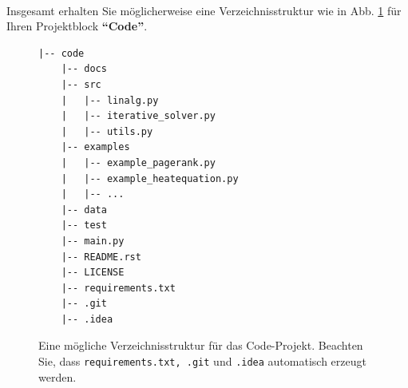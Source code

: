 ~\\
Insgesamt erhalten Sie möglicherweise eine Verzeichnisstruktur wie in Abb. \ref{fig:vz-struktur-code} für Ihren Projektblock \textbf{``Code''}.\\
\begin{figure}[h!]
	\centering
\begin{minipage}{0.4\textwidth}
\begin{verbatim}
|-- code
    |-- docs
    |-- src
    |   |-- linalg.py
    |   |-- iterative_solver.py
    |   |-- utils.py
    |-- examples
    |   |-- example_pagerank.py
    |   |-- example_heatequation.py
    |   |-- ...
    |-- data
    |-- test
    |-- main.py
    |-- README.rst
    |-- LICENSE
    |-- requirements.txt
    |-- .git
    |-- .idea
\end{verbatim}
\end{minipage}
	\caption[Beispiel: Verzeichnisstruktur für \texttt{code}]{Eine mögliche Verzeichnisstruktur für das Code-Projekt. Beachten Sie, dass \texttt{requirements.txt, .git} und \texttt{.idea} automatisch erzeugt werden.}
	\label{fig:vz-struktur-code}
\end{figure}

